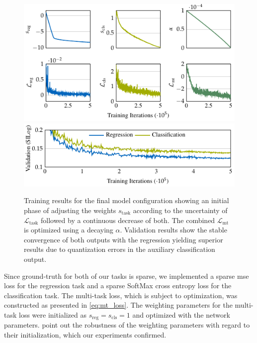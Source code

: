 \documentclass[lang=english]{tumarxivarticle}
\newcommand{\Citet}{\Textcite}
\newcommand{\loss}{\ensuremath{\mathcal{L}}}
\begin{document}
\begin{figure}[t!]
 \centering
 \includegraphics{tikz/multidepth_arxiv-figure5} \\
 \includegraphics{tikz/multidepth_arxiv-figure6}

 \caption{Training results for the final model configuration showing an initial phase of adjusting the weights $s_\text{task}$ according to the uncertainty of $\loss_\text{task}$ followed by a continuous decrease of both. The combined $\loss_\text{mt}$ is optimized using a decaying $\alpha$. Validation results show the stable convergence of both outputs with the regression yielding superior results due to quantization errors in the auxiliary classification output.}
 \label{fig:training_results}
\end{figure}

Since ground-truth for both of our tasks is sparse, we implemented a sparse \gls{mse} loss for the regression task and a sparse SoftMax cross entropy loss for the classification task.
The multi-task loss, which is subject to optimization, was constructed as presented in \cref{eq:mt_loss}.
The weighting parameters for the multi-task loss were initialized as $s_\text{reg} = s_\text{cls} = 1$ and optimized with the network parameters.
\Citet{Kendall18} point out the robustness of the weighting parameters with regard to their initialization, which our experiments confirmed.
\end{document}

